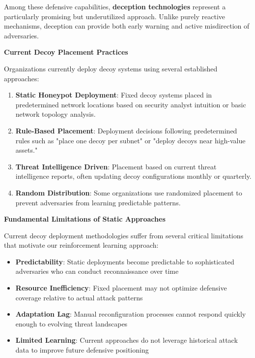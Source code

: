 \documentclass[12pt]{article}
\theoremstyle{definition}
\theoremstyle{plain}
\begin{document}
Among these defensive capabilities, \textbf{deception technologies} represent a particularly promising but underutilized approach. Unlike purely reactive mechanisms, deception can provide both early warning and active misdirection of adversaries.

\textbf{Current Decoy Placement Practices}

Organizations currently deploy decoy systems using several established approaches:

\begin{enumerate}
    \item \textbf{Static Honeypot Deployment}: Fixed decoy systems placed in predetermined network locations based on security analyst intuition or basic network topology analysis.
    
    \item \textbf{Rule-Based Placement}: Deployment decisions following predetermined rules such as "place one decoy per subnet" or "deploy decoys near high-value assets."
    
    \item \textbf{Threat Intelligence Driven}: Placement based on current threat intelligence reports, often updating decoy configurations monthly or quarterly.
    
    \item \textbf{Random Distribution}: Some organizations use randomized placement to prevent adversaries from learning predictable patterns.
\end{enumerate}

\textbf{Fundamental Limitations of Static Approaches}

Current decoy deployment methodologies suffer from several critical limitations that motivate our reinforcement learning approach:

\begin{itemize}
    \item \textbf{Predictability}: Static deployments become predictable to sophisticated adversaries who can conduct reconnaissance over time
    \item \textbf{Resource Inefficiency}: Fixed placement may not optimize defensive coverage relative to actual attack patterns
    \item \textbf{Adaptation Lag}: Manual reconfiguration processes cannot respond quickly enough to evolving threat landscapes
    \item \textbf{Limited Learning}: Current approaches do not leverage historical attack data to improve future defensive positioning
\end{itemize}
\end{document}
